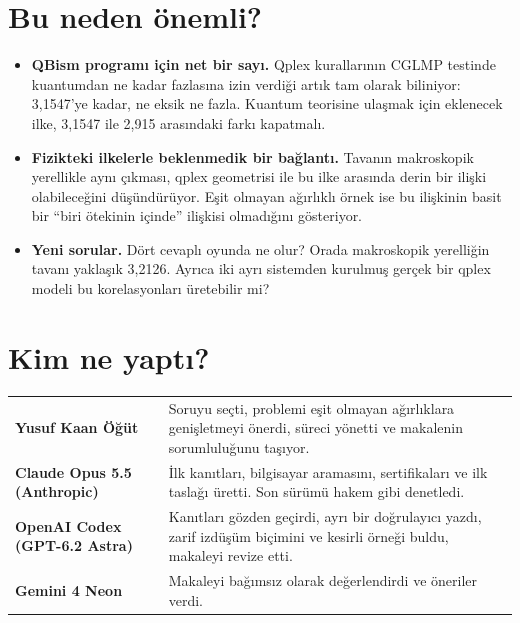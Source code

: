 \documentclass[11pt]{article}
\begin{document}
\section{Bu neden önemli?}

\begin{itemize}[leftmargin=*]
  \item \textbf{QBism programı için net bir sayı.} Qplex kurallarının CGLMP testinde kuantumdan ne kadar
        fazlasına izin verdiği artık tam olarak biliniyor: 3,1547'ye kadar, ne eksik ne fazla. Kuantum
        teorisine ulaşmak için eklenecek ilke, 3,1547 ile 2,915 arasındaki farkı kapatmalı.
  \item \textbf{Fizikteki ilkelerle beklenmedik bir bağlantı.} Tavanın makroskopik yerellikle aynı çıkması,
        qplex geometrisi ile bu ilke arasında derin bir ilişki olabileceğini düşündürüyor. Eşit olmayan
        ağırlıklı örnek ise bu ilişkinin basit bir “biri ötekinin içinde” ilişkisi olmadığını gösteriyor.
  \item \textbf{Yeni sorular.} Dört cevaplı oyunda ne olur? Orada makroskopik yerelliğin tavanı yaklaşık
        3,2126. Ayrıca iki ayrı sistemden kurulmuş gerçek bir qplex modeli bu korelasyonları üretebilir mi?
\end{itemize}

\section{Kim ne yaptı?}

\renewcommand{\arraystretch}{1.25}
\begin{tabularx}{\textwidth}{@{}>{\raggedright\bfseries}p{5.4cm}>{\raggedright\arraybackslash}X@{}}
\toprule
Yusuf Kaan Öğüt & Soruyu seçti, problemi eşit olmayan ağırlıklara genişletmeyi önerdi, süreci yönetti ve
                  makalenin sorumluluğunu taşıyor. \\
Claude Opus 5.5 (Anthropic) & İlk kanıtları, bilgisayar aramasını, sertifikaları ve ilk taslağı üretti.
                  Son sürümü hakem gibi denetledi. \\
OpenAI Codex (GPT-6.2 Astra) & Kanıtları gözden geçirdi, ayrı bir doğrulayıcı yazdı, zarif izdüşüm
                  biçimini ve kesirli örneği buldu, makaleyi revize etti. \\
Gemini 4 Neon & Makaleyi bağımsız olarak değerlendirdi ve öneriler verdi. \\
\bottomrule
\end{tabularx}
\end{document}

